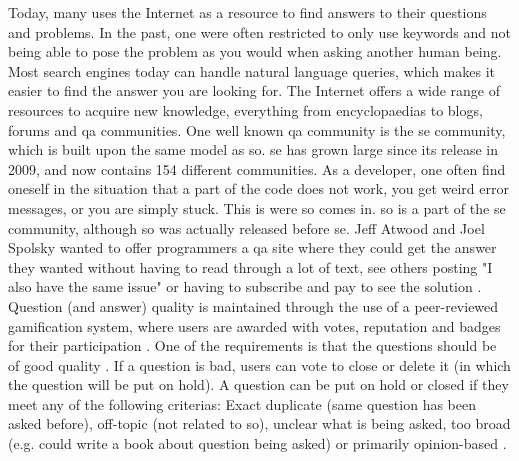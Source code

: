 \label{chap:introduction}

Today, many uses the Internet as a resource to find answers to their questions and problems. 
In the past, one were often restricted to only use keywords and not being able to pose the problem as you would when asking another human being. 
Most search engines today can handle natural language queries, which makes it easier to find the answer you are looking for. 
The Internet offers a wide range of resources to acquire new knowledge, everything from encyclopaedias to blogs, forums and \gls{qa} communities.
One well known \gls{qa} community is the \gls{se} community, which is built upon the same model as \gls{so}.
\gls{se} has grown large since its release in 2009, and now contains 154 different communities.
\vspace{0.5em}\newline
As a developer, one often find oneself in the situation that a part of the code does not work, you get weird error messages, or you are simply stuck. 
This is were \gls{so} comes in. \gls{so} is a part of the \gls{se} community, although \gls{so} was actually released before \gls{se}. 
Jeff Atwood and Joel Spolsky wanted to offer programmers a \gls{qa} site where they could get the answer they wanted without having to read through a lot of text, 
see others posting "I also have the same issue" or having to subscribe and pay to see the solution \cite{Spolsky2008}. 
Question (and answer) quality is maintained through the use of a peer-reviewed gamification system, where users are awarded with votes, reputation and badges for their 
participation \cite{Spolsky2008}. One of the requirements is that the questions should be of good quality 
\cite{Stackoverflow.com2016a, Stackoverflow.com2016d, Stackoverflow.com2016e}.
If a question is bad, users can vote to close or delete it (in which the question will be put on hold). 
A question can be put on hold or closed if they meet any of the following criterias: 
Exact duplicate (same question has been asked before), off-topic (not related to \gls{so}), unclear what is being asked, too broad (e.g. could write a book about question being asked) 
or primarily opinion-based \cite{Stackoverflow.com2016b, CommunityWiki2016b}.


